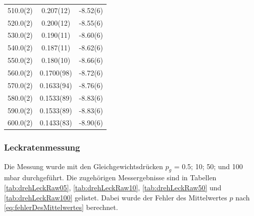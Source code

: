 \begin{longtable}{S[table-format=3.1(1)] S[table-format=3.4(4)] S[table-format=3.4(4)]}
        510.0(2) & 0.207(12) & -8.52(6) \\ 
        520.0(2) & 0.200(12) & -8.55(6) \\ 
        530.0(2) & 0.190(11) & -8.60(6) \\ 
        540.0(2) & 0.187(11) & -8.62(6) \\ 
        550.0(2) & 0.180(10) & -8.66(6) \\ 
        560.0(2) & 0.1700(98) & -8.72(6) \\ 
        570.0(2) & 0.1633(94) & -8.76(6) \\ 
        580.0(2) & 0.1533(89) & -8.83(6) \\ 
        590.0(2) & 0.1533(89) & -8.83(6) \\ 
        600.0(2) & 0.1433(83) & -8.90(6) \\      
    \end{longtable}

    \subsubsection{Leckratenmessung}
    Die Messung wurde mit den Gleichgewichtsdrücken $p_g$ = 0.5; 10; 50; und 100 \unit{\milli\bar} durchgeführt.
    Die zugehörigen Messergebnisse sind in Tabellen \ref{tab:drehLeckRaw05}, \ref{tab:drehLeckRaw10}, \ref{tab:drehLeckRaw50} und \ref{tab:drehLeckRaw100}
    gelistet. Dabei wurde der Fehler des Mittelwertes $p$ nach \autoref{eq:fehlerDesMittelwertes} berechnet.\\

